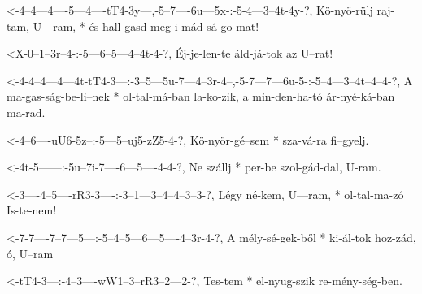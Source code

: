   {<-4--4---4----5---4----tT4-3y---,-5--7----6u---5x-:-5-4---3--4t-4y-?,}
  {  Kö-nyö-rülj raj-tam, U---ram, * és hall-gasd meg  i-mád-sá-go-mat!}

  {<X-0--1--3r--4-:-5---6--5---4--4t-4-?,}
  {   Éj-je-len-te  áld-já-tok az U--rat!}

  {<-4-4--4---4---4t-tT4-3---:-3--5---5u-7---4--3r-4--,-5-7---7---6u-5-:-5--4---3--4t--4--4-?,}
  {  A ma-gas-ság-be-li--nek * ol-tal-má-ban la-ko-zik, a min-den-ha-tó  ár-nyé-ká-ban ma-rad.}

  {<-4--6----uU6-5z--:-5---5--uj5-zZ5-4-?,}
  {  Kö-nyör-gé--sem * sza-vá-ra  fi--gyelj.}

  {<-4t-5------:-5u--7i-7----6---5----4-4-?,}
  {  Ne szállj * per-be szol-gád-dal, U-ram.}

  {<-3----4--5----rR3-3----:-3--1---3--4--4--3--3-?,}
  {  Légy né-kem, U---ram, * ol-tal-ma-zó Is-te-nem!}

  {<-7-7----7--7---5---:-5--4--5---6---5----4--3r-4-?,}
  {  A mély-sé-gek-ből * ki-ál-tok hoz-zád, ó, U--ram}

  {<-tT4-3---:-4--3----wW1--3--rR3--2---2-?,}
  {  Tes-tem * el-nyug-szik re-mény-ség-ben.}


